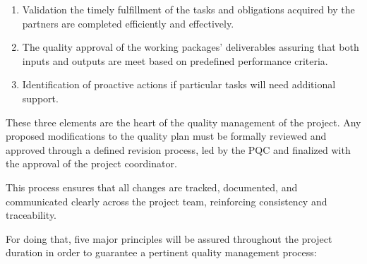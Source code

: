 \documentclass[
  12pt,
  oneside]{book}
\providecommand{\tightlist}{%
  \setlength{\itemsep}{0pt}\setlength{\parskip}{0pt}}\usepackage{longtable,booktabs,array}
\begin{document}
\begin{enumerate}
\def\labelenumi{\arabic{enumi}.}
\tightlist
\item
  Validation the timely fulfillment of the tasks and obligations
  acquired by the partners are completed efficiently and effectively.\\
\item
  The quality approval of the working packages' deliverables assuring
  that both inputs and outputs are meet based on predefined performance
  criteria.
\item
  Identification of proactive actions if particular tasks will need
  additional support.
\end{enumerate}

These three elements are the heart of the quality management of the
project. Any proposed modifications to the quality plan must be formally
reviewed and approved through a defined revision process, led by the PQC
and finalized with the approval of the project coordinator.

This process ensures that all changes are tracked, documented, and
communicated clearly across the project team, reinforcing consistency
and traceability.

For doing that, five major principles will be assured throughout the
project duration in order to guarantee a pertinent quality management
process:
\end{document}
